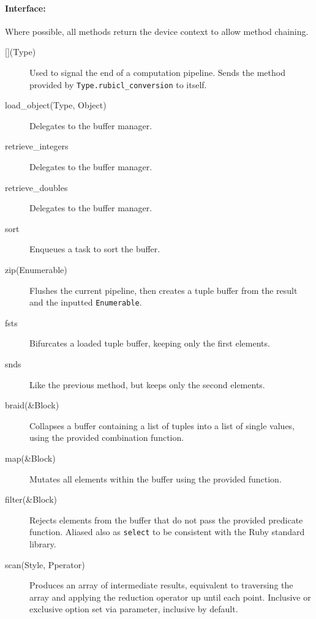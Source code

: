 \begin{description}
\paragraph*{Interface:}
Where possible, all methods return the device context to allow method chaining.
\begin{description}
  \item[$\lbrack\rbrack$(Type)] Used to signal the end of a computation pipeline. Sends the method provided by \verb|Type.rubicl_conversion| to itself.

  \item[load\_object(Type, Object)] Delegates to the buffer manager.

  \item[retrieve\_integers] Delegates to the buffer manager.

  \item[retrieve\_doubles] Delegates to the buffer manager.

  \item[sort] Enqueues a task to sort the buffer.

  \item[zip(Enumerable)] Flushes the current pipeline, then creates a tuple buffer from the result and the inputted \verb|Enumerable|.

  \item[fsts] Bifurcates a loaded tuple buffer, keeping only the first elements.

  \item[snds] Like the previous method, but keeps only the second elements.

  \item[braid(\&Block)] Collapses a buffer containing a list of tuples into a list of single values, using the provided combination function.

  \item[map(\&Block)] Mutates all elements within the buffer using the provided function.

  \item[filter(\&Block)] Rejects elements from the buffer that do not pass the provided predicate function. Aliased also as \verb|select| to be consistent with the Ruby standard library.

  \item[scan(Style, Pperator)] Produces an array of intermediate results, equivalent to traversing the array and applying the reduction operator up until each point. Inclusive or exclusive option set via parameter, inclusive by default.



\end{description}
\end{description}
